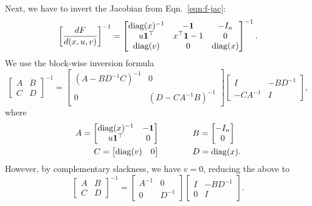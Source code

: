 \documentclass[11pt]{article}
\begin{document}
Next, we have to invert the Jacobian from Eqn.~\ref{eqn:f-jac}:
\begin{equation}
\label{eqn:dsystem-matrix}
\left[\frac{dF}{d(x,u,v)}\right]^{-1} = \begin{bmatrix}
\mathrm{diag}(x)^{-1} & -\mathbf{1} & -I_n \\
u\mathbf{1}^\top & x^\top\mathbf{1} - 1 & 0\\
\mathrm{diag}(v) & 0 & \mathrm{diag}(x)
\end{bmatrix}^{-1}.
\end{equation}
We use the block-wise inversion formula
\begin{equation*}
\begin{bmatrix}
A & B\\
C & D
\end{bmatrix}^{-1} = \begin{bmatrix}
    (A - BD^{-1}C)^{-1} & 0\\
    0 & (D - CA^{-1}B)^{-1}
\end{bmatrix}
\begin{bmatrix}
    I & -BD^{-1}\\
    -CA^{-1} & I
\end{bmatrix},
\end{equation*}
where
\begin{align*}
A = \begin{bmatrix} \mathrm{diag}(x)^{-1} & -\mathbf{1} \\ u\mathbf{1}^\top & 0 \end{bmatrix}&\qquad\qquad
B = \begin{bmatrix}-I_n \\ 0\end{bmatrix}\\
C = \begin{bmatrix}\mathrm{diag}(v) & 0\end{bmatrix} &\qquad\qquad
D = \mathrm{diag}(x).
\end{align*}
However, by complementary slackness, we have $v = 0$, reducing the above to
\begin{equation*}
\begin{bmatrix}
A & B\\
C & D
\end{bmatrix}^{-1} = \begin{bmatrix}
    A^{-1} & 0\\
    0 & D^{-1}
\end{bmatrix}
\begin{bmatrix}
    I & -BD^{-1}\\
    0 & I
\end{bmatrix}.
\end{equation*}
\end{document}
